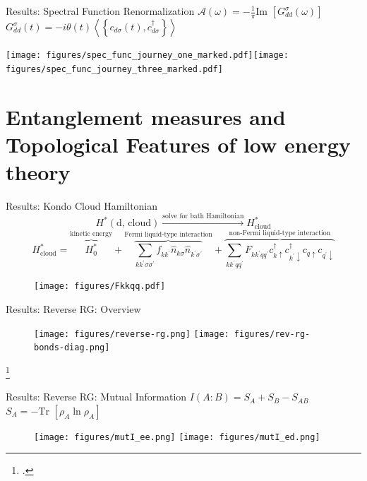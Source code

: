 \documentclass[aspectratio=169]{beamer}
\newcommand{\cen}[1]{\begin{center}{#1}\end{center}}
\begin{document}
\begin{frame}[noframenumbering]{Results: Spectral Function Renormalization}
	\(\mathcal{A(\omega)} = -\frac{1}{\pi}\text{Im }\left[G_{d d}^\sigma\left( \omega \right) \right]\) \hspace*{\fill} \(G_{d d}^\sigma\left(t\right) = -i\theta(t)\left<\left\{ c_{d\sigma}(t), c^\dagger_{d\sigma} \right\}\right>\)
\cen{
	\texttt{[image: figures/spec\_func\_journey\_one\_marked.pdf]}\hspace*{\fill}\texttt{[image: figures/spec\_func\_journey\_three\_marked.pdf]}
}
\end{frame}

\section{Entanglement measures and Topological Features of low energy theory}
\begin{frame}[noframenumbering]{Results: Kondo Cloud Hamiltonian}
	\vspace*{-10pt}
	\[H^*(\text{d, cloud}) \xrightarrow{\text{solve for bath Hamiltonian}} H^*_\text{cloud}\] 
	\[H^*_\text{cloud} = \overbrace{H^*_0}^\text{kinetic energy} + \overbrace{\sum_{kk^\prime\sigma\sigma^\prime}f_{kk^\prime}\hat n_{k\sigma}\hat n_{k^\prime\sigma^\prime}}^\text{Fermi liquid-type interaction} + \overbrace{\sum_{kk^\prime qq^\prime}F_{kk^\prime qq^\prime}c^\dagger_{k \uparrow}c^\dagger_{k^\prime \downarrow} c_{q \uparrow}c_{q^\prime \downarrow}}^\text{non-Fermi liquid-type interaction}\]
\begin{figure}[htpb]
	\centering
	\texttt{[image: figures/Fkkqq.pdf]}
\end{figure}
\end{frame}

\begin{frame}[noframenumbering]{Results: Reverse RG: Overview}
	\vspace*{\fill}
	\begin{figure}[htpb]
		\centering
		\texttt{[image: figures/reverse-rg.png]}
		\hspace*{\fill}
		\texttt{[image: figures/rev-rg-bonds-diag.png]}
	\end{figure}
	\vspace*{\fill}
\footcite{am_thesis}
\end{frame}

\begin{frame}[noframenumbering]{Results: Reverse RG: Mutual Information}
	\hspace*{\fill}	\(I(A:B) = S_A + S_B - S_{AB}\)\hspace*{\fill}\(S_A = -\text{Tr }\left[\rho_A \ln \rho_A\right]\)\hspace*{\fill}
	\begin{figure}[htpb]
		\centering
		\texttt{[image: figures/mutI\_ee.png]}\hspace*{\fill}
		\texttt{[image: figures/mutI\_ed.png]}
	\end{figure}
\end{frame}
\end{document}
